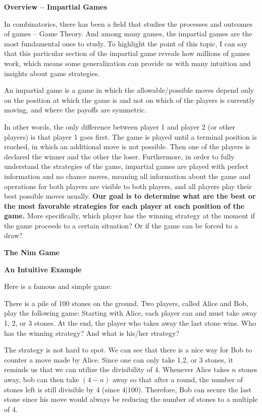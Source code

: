 \noindent
\textbf{Overview -- Impartial Games}

	In combinatorics, there has been a field that studies the processes and outcomes of games -- Game Theory. And among many games, the impartial games are the most fundamental ones to study. To highlight the point of this topic, I can say that this particular section of the impartial game reveals how millions of games work, which means some generalization can provide us with many intuition and insights about game strategies.
	\begin{definition}
		An impartial game is a game in which the allowable/possible moves depend only on the position at which the game is and not on which of the players is currently moving, and where the payoffs are symmetric.
	\end{definition}
	
	In other words, the only difference between player 1 and player 2 (or other players) is that player 1 goes first. The game is played until a terminal position is reached, in which an additional move is not possible. Then one of the players is declared the winner and the other the loser. Furthermore, in order to fully understand the strategies of the game, impartial games are played with perfect information and no chance moves, meaning all information about the game and operations for both players are visible to both players, and all players play their best possible moves usually. \textbf{Our goal is to determine what are the best or the most favorable strategies for each player at each position of the game.} More specifically, which player has the winning strategy at the moment if the game proceeds to a certain situation? Or if the game can be forced to a draw?

\noindent
\textbf{The Nim Game}

\noindent
\textbf{An Intuitive Example}

Here is a famous and simple game:
		\begin{problem}
			There is a pile of 100 stones on the ground. Two players, called Alice and Bob, play the following game: Starting with Alice, each player can and must take away 1, 2, or 3 stones. At the end, the player who takes away the last stone wins. Who has the winning strategy? And what is his/her strategy?
		\end{problem}
		\begin{solution}
			The strategy is not hard to spot. We can see that there is a nice way for Bob to counter a move made by Alice. Since one can only take 1,2, or 3 stones, it reminds us that we can utilize the divisibility of 4. Whenever Alice takes $n$ stones away, bob can then take $(4-n)$ away so that after a round, the number of stones left is still divisible by 4 (since $4|100$). Therefore, Bob can secure the last stone since his move would always be reducing the number of stones to a multiple of 4.
		\end{solution}
	
